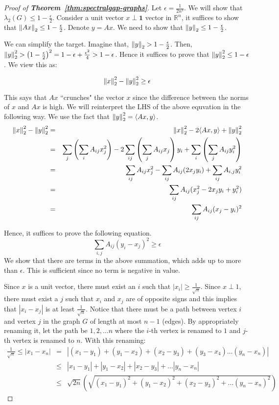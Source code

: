 \begin{proof}[{Proof of \bf Theorem~\ref{thm:spectralgap-graphs}}]
Let $\epsilon = \frac{1}{2n^3}$. We will show that $\lambda_2(G) \le 1-\frac{\epsilon}{2}$. Consider a unit vector $x \perp \textbf{1}$ vector in $\mathbb{R}^n$, it suffices to show that ${\left\lVert Ax\right\rVert}_2 \le 1 -\frac{\epsilon}{2}$. Denote $y = Ax$. We need to show that ${\left\lVert y\right\rVert}_2 \le 1-\frac{\epsilon}{2}$.

\noindent We can simplify the target. Imagine that, ${\left\lVert y\right\rVert}_2 > 1-\frac{\epsilon}{2}$. Then, ${\left\lVert y\right\rVert}_2^2 > \left(1-\frac{\epsilon}{2}\right)^2 = 1-\epsilon+\frac{\epsilon^2}{4} > 1-\epsilon$. Hence it suffices to prove that ${\left\lVert y\right\rVert}_2^2 \le 1-\epsilon$. We view this as: 

$${\left\lVert x\right\rVert}_2^2-{\left\lVert y\right\rVert}_2^2 \ge \epsilon$$

This says that $Ax$ ``crunches" the vector $x$ since the difference between the norms of $x$ and $Ax$ is high. We will reinterpret the LHS of the above equvation in the following way. We use the fact that ${\left\lVert y\right\rVert}_2^2 = \langle Ax,y \rangle$.
\begin{eqnarray*}
{\left\lVert x\right\rVert}_2^2-{\left\lVert y\right\rVert}_2^2 & = & {\left\lVert x\right\rVert}_2^2-2\langle Ax,y \rangle+{\left\lVert y\right\rVert}_2^2 \\
& = & \sum_{j} \left( \sum_i A_{ij}x_j^2 \right) - 2 \sum_{ij} \left(\sum_{j} A_{ij}x_j\right) y_i + \sum_{i} \left( \sum_j A_{ij}y_i^2 \right) \\
& = & \sum_{ij} A_{ij}x_j^2 - \sum_{ij} A_{ij}(2x_jy_i) + \sum_{ij} A_{i,j}y_i^2 \\
& = & \sum_{ij} A_{ij} (x_j^2 - 2x_jy_i + y_i^2) \\
& = & \sum_{ij} A_{ij} (x_j-y_i)^2
\end{eqnarray*}

\noindent Hence, it suffices to prove the following equation.
\begin{equation}
\sum_{i,j} A_{ij}(y_i-x_j)^2 \ge \epsilon
\label{eqn:weak-exp}
\end{equation}
We show that there are terms in the above summation, which adds up to more than $\epsilon$. This is sufficient since no term is negative in value.

Since $x$ is a unit vector, there must exist an $i$ such that $|x_i| \ge \frac{1}{\sqrt{n}}$. Since $x \perp 1$, there must exist a $j$ such that $x_i$ and $x_j$ are of opposite signs and this implies that $|x_i-x_j|$ is at least $\frac{1}{\sqrt{n}}$. Notice that there must be a path between vertex $i$ and vertex $j$ in the graph $G$ of length at most $n-1$ (edges). By appropriately renaming it, let the path be $1,2, \ldots n$ where the $i$-th vertex is renamed to $1$ and $j$-th vertex is renamed to $n$. With this renaming:
\begin{eqnarray*}
\frac{1}{\sqrt{n}} \le |x_1 - x_n| & = & \left|(x_1 - y_1) + (y_1 - x_2) + (x_2 - y_3) + (y_3-x_4) \ldots (y_n -  x_n)\right| \\
& \le & |x_1 - y_1| + |y_1 - x_2| + |x_2 - y_3| + \ldots |y_n -  x_n| \\
& \le & \sqrt{2n}\left( \sqrt{(x_1 - y_1)^2 + (y_1 - x_2)^2 + (x_2 - y_3)^2 + \ldots (y_n -  x_n)^2} \right) 
\end{eqnarray*}


\end{proof}
